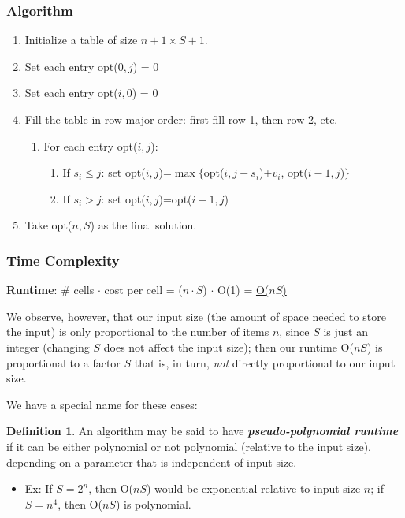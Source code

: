 \documentclass[12pt]{extarticle}
\theoremstyle{definition}
\newtheorem*{definition}{Definition}
\theoremstyle{remark}
\begin{document}
\subsubsection*{Algorithm}
\begin{enumerate}
    \item Initialize a table of size $n+1\times S+1$.
    \item Set each entry opt($0,j$) = 0
    \item Set each entry opt($i,0$) = 0
    \item Fill the table in \ul{row-major} order: first fill row 1, then row 2, etc. \begin{enumerate}
        \item For each entry opt($i,j$): \begin{enumerate}
            \item If $s_i\leq j$: set opt($i,j$)=$\max\{$opt($i,j-s_i$)+$v_i$, opt($i-1,j$)$\}$
            \item If $s_i>j$: set opt($i,j$)=opt($i-1,j$)
        \end{enumerate}
    \end{enumerate}
    \item Take opt($n,S$) as the final solution.
\end{enumerate}

\subsubsection*{Time Complexity}
\noindent \textbf{Runtime}: \# cells $\cdot$ cost per cell = ($n\cdot S$) $\cdot$ O(1) = \ul{O($nS$)}

\vspace{8pt}
We observe, however, that our input size (the amount of space needed to store the input) is only proportional to the number of items $n$, since $S$ is just an integer (changing $S$ does not affect the input size); then our runtime O($nS$) is proportional to a factor $S$ that is, in turn, \textit{not} directly proportional to our input size. 

\vspace{8pt}
\noindent We have a special name for these cases:

\begin{definition}
    An algorithm may be said to have \textbf{\textit{pseudo-polynomial runtime}} if it can be either polynomial or not polynomial (relative to the input size), depending on a parameter that is independent of input size.\begin{itemize}
        \item Ex: If $S=2^n$, then O($nS$) would be exponential relative to input size $n$; if $S=n^4$, then O($nS$) is polynomial.
    \end{itemize}
\end{definition}
\end{document}
